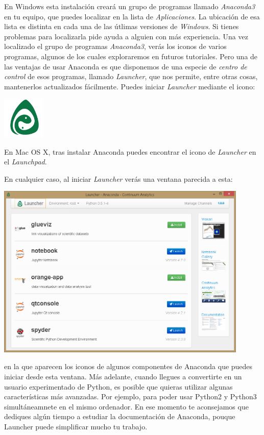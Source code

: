 \documentclass[10pt,a4paper]{article}\usepackage[]{graphicx}\usepackage[]{color}
\newcounter {cont01}
\begin{document}
En Windows esta instalación creará un grupo de programas llamado {\em Anaconda3} en tu equipo, que puedes localizar en la lista de {\em Aplicaciones}. La ubicación de esa lista es distinta en cada una de las útlimas versiones de {\em Windows}. Si tienes problemas para localizarla pide ayuda a alguien con más experiencia. Una vez localizado el grupo de programas {\em Anaconda3}, verás los iconos de varios programas, algunos de los cuales  exploraremos en futuros tutoriales. Pero una de las ventajas de usar Anaconda es que disponemos de una especie de {\em centro de control} de esos programas, llamado {\em Launcher}, que nos permite, entre otras cosas, mantenerlos actualizados fácilmente. Puedes iniciar {\em Launcher} mediante el icono:
\begin{center}
\includegraphics[width=2cm]{../fig/Tut-00-py-15-AnacondaIcon.png}\\[1cm]
\end{center}
En Mac OS X, tras instalar Anaconda puedes encontrar el icono de {\em Launcher} en el {\em Launchpad}. 

En cualquier caso, al iniciar  {\em Launcher} verás una ventana parecida a esta:
\begin{center}
\includegraphics[width=12cm]{../fig/Tut-00-py-16-Launcher.png}\\[1cm]
\end{center}
en la que aparecen los iconos de algunos componentes de Anaconda que puedes iniciar desde esta ventana. Más adelante, cuando llegues a convertirte en un usuario experimentado de Python, es posible que quieras utilizar algunas características más avanzadas. Por ejemplo, para poder usar Python2 y Python3 simultáneamnete en el mismo ordenador. En ese momento te aconsejamos que dediques algún tiempo a estudiar la documentación de Anaconda, pouque Launcher puede simplificar mucho tu trabajo. 
\end{document}
